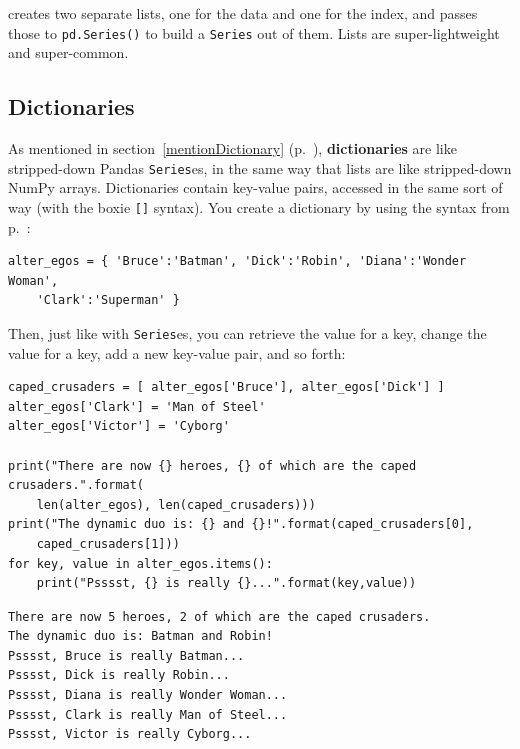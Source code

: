 creates two separate lists, one for the data and one for the index, and passes
those to \texttt{pd.Series()} to build a \texttt{Series} out of them. Lists are
super-lightweight and super-common.

\subsection{Dictionaries}


As mentioned in section~\ref{mentionDictionary}
(p.~\pageref{mentionDictionary}), \textbf{dictionaries} are like stripped-down
Pandas \texttt{Series}es, in the same way that lists are like stripped-down
NumPy arrays. Dictionaries contain key-value pairs, accessed in the same sort
of way (with the boxie \texttt{[]} syntax). You create a dictionary by
using the syntax from p.~\pageref{mentionDictionary2}:

\begin{Verbatim}[fontsize=\small,samepage=true,frame=single,framesep=3mm]
alter_egos = { 'Bruce':'Batman', 'Dick':'Robin', 'Diana':'Wonder Woman',
    'Clark':'Superman' }
\end{Verbatim}

Then, just like with \texttt{Series}es, you can retrieve the value for a key,
change the value for a key, add a new key-value pair, and so forth:


\begin{Verbatim}[fontsize=\footnotesize,samepage=true,frame=single,framesep=3mm]
caped_crusaders = [ alter_egos['Bruce'], alter_egos['Dick'] ]
alter_egos['Clark'] = 'Man of Steel'
alter_egos['Victor'] = 'Cyborg'

print("There are now {} heroes, {} of which are the caped crusaders.".format(
    len(alter_egos), len(caped_crusaders)))
print("The dynamic duo is: {} and {}!".format(caped_crusaders[0],
    caped_crusaders[1]))
for key, value in alter_egos.items():
    print("Psssst, {} is really {}...".format(key,value))
\end{Verbatim}
\vspace{-.2in}

\begin{Verbatim}[fontsize=\small,samepage=true,frame=leftline,framesep=5mm,framerule=1mm]
There are now 5 heroes, 2 of which are the caped crusaders.
The dynamic duo is: Batman and Robin!
Psssst, Bruce is really Batman...
Psssst, Dick is really Robin...
Psssst, Diana is really Wonder Woman...
Psssst, Clark is really Man of Steel...
Psssst, Victor is really Cyborg...
\end{Verbatim}

